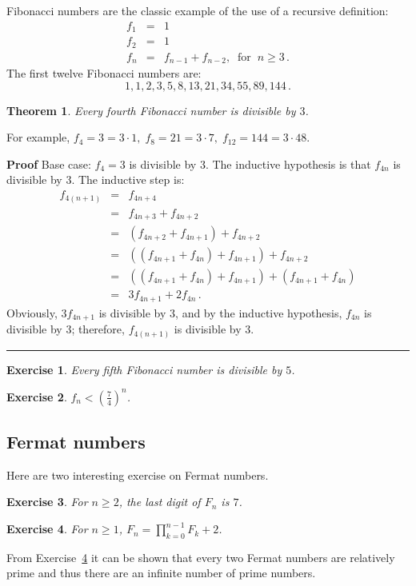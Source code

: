 \documentclass[11pt,a4paper]{report}
\newcommand*{\qed}{\hfill\rule{1ex}{1.5ex}}
\newtheorem{theorem}{Theorem}
\newtheorem{exercise}{Exercise}
\begin{document}
Fibonacci numbers are the classic example of the use of a recursive definition:
\begin{eqnarray*}
f_1 &=& 1\\
f_2 &=& 1\\
f_n &=& f_{n-1} + f_{n-2}, \;\; \textrm{for} \;\; n \geq 3\,.
\end{eqnarray*}
The first twelve Fibonacci numbers are:
\[
1, 1, 2, 3, 5, 8, 13, 21, 34, 55, 89, 144\,.
\]

\begin{theorem}
Every fourth Fibonacci number is divisible by $3$.
\end{theorem}

For example, $f_4=3=3\cdot 1,\; f_8=21=3\cdot 7,\; f_{12}=144=3\cdot 48$.

\textbf{Proof} Base case: $f_4=3$ is divisible by $3$. The inductive hypothesis is that $f_{4n}$ is divisible by $3$. The inductive step is:
\begin{eqnarray*}
f_{4(n+1)} &=& f_{4n+4}\\
&=& f_{4n+3}+f_{4n+2}\\
&=& (f_{4n+2}+f_{4n+1})+f_{4n+2}\\
&=& ((f_{4n+1}+f_{4n})+f_{4n+1})+f_{4n+2}\\
&=& ((f_{4n+1}+f_{4n})+f_{4n+1})+(f_{4n+1}+f_{4n})\\
&=& 3f_{4n+1}+2f_{4n}\,.
\end{eqnarray*}
Obviously, $3f_{4n+1}$ is divisible by $3$, and by the inductive hypothesis, $f_{4n}$ is divisible by $3$; therefore, $f_{4(n+1)}$ is divisible by $3$.\qed

\begin{exercise}
Every fifth Fibonacci number is divisible by $5$.
\end{exercise}

\begin{exercise}
$f_n < (\frac{7}{4})^n$.
\end{exercise}

\subsection*{Fermat numbers}

Here are two interesting exercise on Fermat numbers.


\begin{exercise}
For $n\geq 2$, the last digit of $F_n$ is $7$.
\end{exercise}

\begin{exercise}\label{ex.fermat}
For $n\geq 1$, $\displaystyle F_n = \prod_{k=0}^{n-1} F_k + 2$.
\end{exercise}
From Exercise~\ref{ex.fermat} it can be shown that every two Fermat numbers are relatively prime and thus there are an infinite number of prime numbers.
\end{document}
